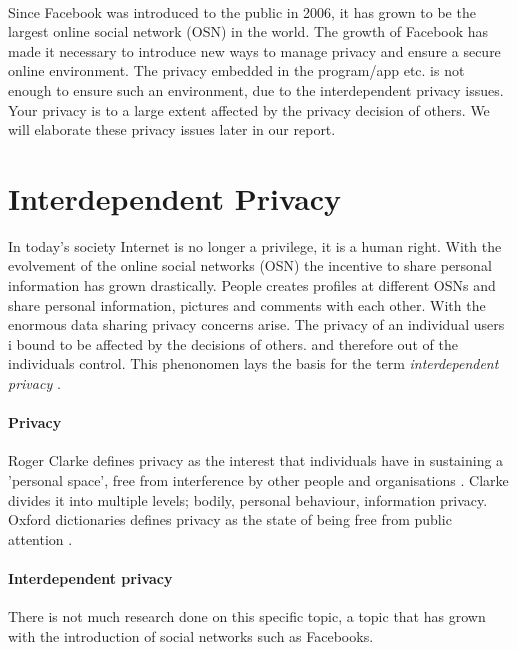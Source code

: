 \paragraph{}
Since Facebook was introduced to the public in 2006, it has grown to be the largest online social network (OSN) in the world. The growth of Facebook has made it necessary to introduce new ways to manage privacy and ensure a secure online environment. The privacy embedded in the program/app etc. is not enough to ensure such an environment, due to the interdependent privacy issues. Your privacy is to a large extent affected by the privacy decision of others. We will elaborate these privacy issues later in our report. 


\section{Interdependent Privacy}
In today's society Internet is no longer a privilege, it is a human right. With the evolvement of the online social networks (OSN) the incentive to share personal information has grown drastically. People creates profiles at different OSNs and share personal information, pictures and comments with each other. With the enormous data sharing privacy concerns arise. The privacy of an individual users i bound to be affected by the decisions of others. and therefore out of the individuals control. This phenonomen lays the basis for the term \textit{interdependent privacy} \cite{InterdependetPriv}. 

\paragraph{Privacy}
Roger Clarke defines privacy as the interest that individuals have in sustaining a 'personal space', free from interference by other people and organisations \cite{privacy}. Clarke divides it into multiple levels; bodily, personal behaviour, information privacy. Oxford dictionaries defines privacy as the state of being free from public attention \cite{defprivacy}.  

\paragraph{Interdependent privacy}



There is not much research done on this specific topic, a topic that has grown with the introduction of social networks such as Facebooks. 

